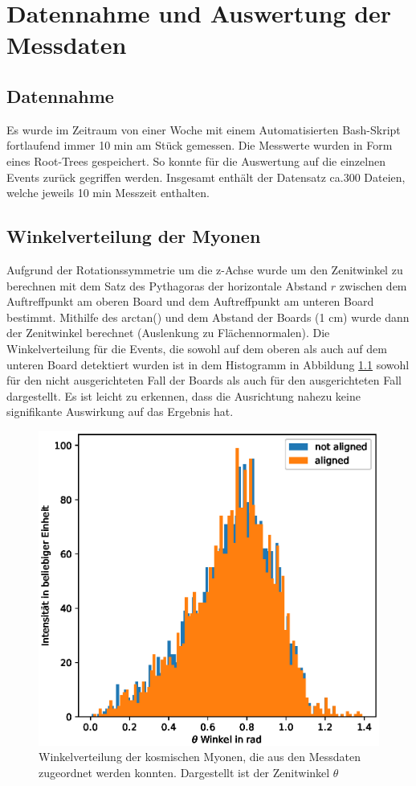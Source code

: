 \documentclass[usenames,dvipsnames]{include/protokollclass}
\begin{document}
	
	\chapter{Datennahme und Auswertung der Messdaten}
	\section{Datennahme}
	Es wurde im Zeitraum von einer Woche mit einem Automatisierten Bash-Skript fortlaufend immer 10 min am Stück gemessen. Die Messwerte wurden in Form eines Root-Trees gespeichert. So konnte für die Auswertung auf die einzelnen Events zurück gegriffen werden. Insgesamt enthält der Datensatz ca.300 Dateien, welche jeweils 10 min Messzeit enthalten.
	
	 
	\section{Winkelverteilung der Myonen}
	Aufgrund der Rotationssymmetrie um die z-Achse wurde um den Zenitwinkel zu berechnen mit dem Satz des Pythagoras der horizontale Abstand $r$ zwischen dem Auftreffpunkt am oberen Board und dem Auftreffpunkt am unteren Board bestimmt. Mithilfe des arctan() und dem Abstand der Boards (1 cm) wurde dann der Zenitwinkel berechnet (Auslenkung zu Flächennormalen). Die Winkelverteilung für die Events, die sowohl auf dem oberen als auch auf dem unteren Board detektiert wurden ist in dem Histogramm in Abbildung \ref{fig:winkelverteilung} sowohl für den nicht ausgerichteten Fall der Boards als auch für den ausgerichteten Fall dargestellt. Es ist leicht zu erkennen, dass die Ausrichtung nahezu keine signifikante Auswirkung auf das Ergebnis hat.
	
	\begin{figure}
		\centering
		\includegraphics[width=\textwidth]{fig/winkelverteilung.eps}
		\caption{Winkelverteilung der kosmischen Myonen, die aus den Messdaten zugeordnet werden konnten. Dargestellt ist der Zenitwinkel $\theta$}
		\label{fig:winkelverteilung}
	\end{figure}
	
\end{document}
